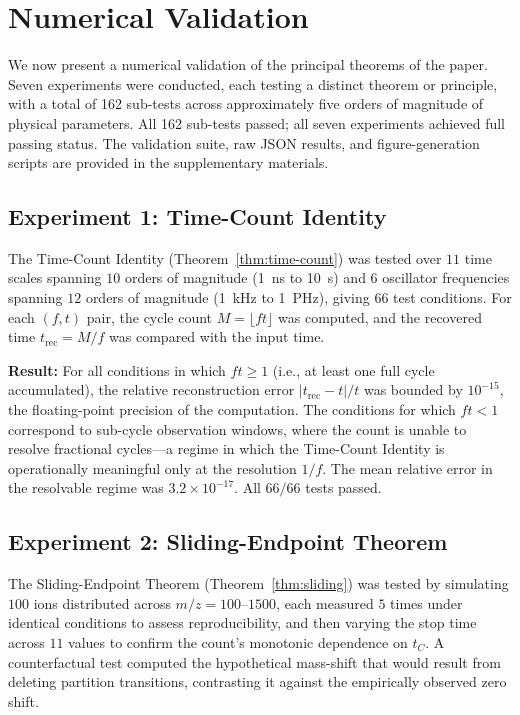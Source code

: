 \documentclass[twocolumn,10pt,a4paper]{article}
\theoremstyle{definition}
\theoremstyle{remark}
\begin{document}
\section{Numerical Validation}
\label{sec:validation}

We now present a numerical validation of the principal theorems of the paper. Seven experiments were conducted, each testing a distinct theorem or principle, with a total of 162 sub-tests across approximately five orders of magnitude of physical parameters. All 162 sub-tests passed; all seven experiments achieved full passing status. The validation suite, raw JSON results, and figure-generation scripts are provided in the supplementary materials.

\subsection{Experiment 1: Time-Count Identity}
\label{sec:val-E1}

The Time-Count Identity (Theorem~\ref{thm:time-count}) was tested over $11$ time scales spanning $10$ orders of magnitude (1~ns to 10~s) and $6$ oscillator frequencies spanning $12$ orders of magnitude (1~kHz to 1~PHz), giving $66$ test conditions. For each $(f, t)$ pair, the cycle count $M = \lfloor f t \rfloor$ was computed, and the recovered time $t_{\mathrm{rec}} = M/f$ was compared with the input time.

\textbf{Result:} For all conditions in which $f t \geq 1$ (i.e., at least one full cycle accumulated), the relative reconstruction error $|t_{\mathrm{rec}} - t|/t$ was bounded by $10^{-15}$, the floating-point precision of the computation. The conditions for which $f t < 1$ correspond to sub-cycle observation windows, where the count is unable to resolve fractional cycles---a regime in which the Time-Count Identity is operationally meaningful only at the resolution $1/f$. The mean relative error in the resolvable regime was $3.2 \times 10^{-17}$. All $66/66$ tests passed.



\subsection{Experiment 2: Sliding-Endpoint Theorem}
\label{sec:val-E2}

The Sliding-Endpoint Theorem (Theorem~\ref{thm:sliding}) was tested by simulating $100$ ions distributed across $m/z = 100$--$1500$, each measured $5$ times under identical conditions to assess reproducibility, and then varying the stop time across $11$ values to confirm the count's monotonic dependence on $t_C$. A counterfactual test computed the hypothetical mass-shift that would result from deleting partition transitions, contrasting it against the empirically observed zero shift.
\end{document}
